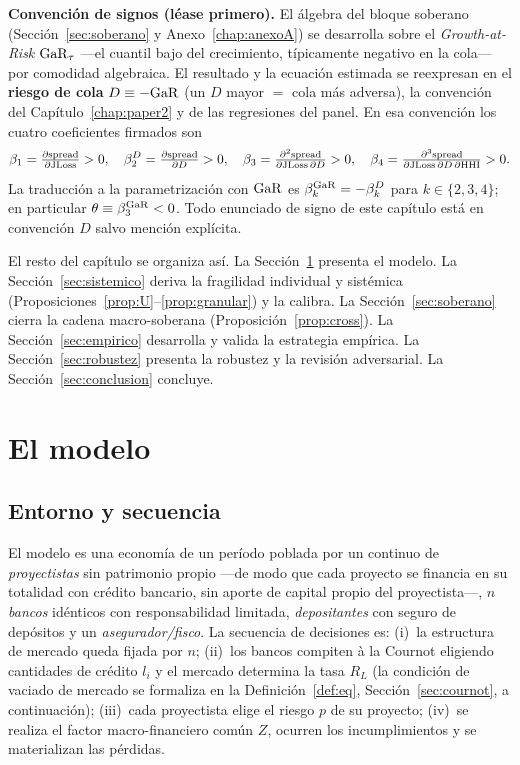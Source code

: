 \begin{mdframed}
\noindent\textbf{Convención de signos (léase primero).} El álgebra del bloque soberano
(Sección~\ref{sec:soberano} y Anexo~\ref{chap:anexoA}) se desarrolla sobre el
\textit{Growth-at-Risk} $\mathrm{GaR}_\tau$ —el cuantil bajo del crecimiento, típicamente
negativo en la cola— por comodidad algebraica. El resultado y la ecuación estimada
se reexpresan en el \textbf{riesgo de cola} $D\equiv-\mathrm{GaR}$ (un $D$ mayor $=$ cola
más adversa), la convención del Capítulo~\ref{chap:paper2} y de las regresiones del
panel. En esa convención los cuatro coeficientes firmados son
\[
\beta_1=\tfrac{\partial\mathrm{spread}}{\partial\mathrm{JLoss}}>0,\quad
\beta_2^{D}=\tfrac{\partial\mathrm{spread}}{\partial D}>0,\quad
\beta_3=\tfrac{\partial^2\mathrm{spread}}{\partial\mathrm{JLoss}\,\partial D}>0,\quad
\beta_4=\tfrac{\partial^3\mathrm{spread}}{\partial\mathrm{JLoss}\,\partial D\,\partial\mathrm{HHI}}>0.
\]
La traducción a la parametrización con $\mathrm{GaR}$ es $\beta_k^{\mathrm{GaR}}=-\beta_k^{D}$ para
$k\in\{2,3,4\}$; en particular $\theta\equiv\beta_3^{\mathrm{GaR}}<0$. Todo enunciado de
signo de este capítulo está en convención $D$ salvo mención explícita.
\end{mdframed}

El resto del capítulo se organiza así. La Sección~\ref{sec:modelo} presenta el modelo. La Sección~\ref{sec:sistemico} deriva la fragilidad individual y sistémica (Proposiciones~\ref{prop:U}--\ref{prop:granular}) y la calibra. La Sección~\ref{sec:soberano} cierra la cadena macro-soberana (Proposición~\ref{prop:cross}). La Sección~\ref{sec:empirico} desarrolla y valida la estrategia empírica. La Sección~\ref{sec:robustez} presenta la robustez y la revisión adversarial. La Sección~\ref{sec:conclusion} concluye.

\section{El modelo}\label{sec:modelo}

\subsection{Entorno y secuencia}
El modelo es una economía de un período poblada por un continuo de \textit{proyectistas} sin
patrimonio propio —de modo que cada proyecto se financia en su totalidad con crédito bancario,
sin aporte de capital propio del proyectista—, $n$ \textit{bancos} idénticos con
responsabilidad limitada, \textit{depositantes} con seguro de depósitos y un
\textit{asegurador/fisco}. La secuencia de decisiones es:
(i)~la estructura de mercado queda fijada por $n$; (ii)~los bancos compiten à la Cournot
eligiendo cantidades de crédito $l_i$ y el mercado determina la tasa $R_L$ (la condición de
vaciado de mercado se formaliza en la Definición~\ref{def:eq}, Sección~\ref{sec:cournot}, a
continuación); (iii)~cada proyectista elige el riesgo $p$ de su proyecto; (iv)~se realiza el
factor macro-financiero común $Z$, ocurren los incumplimientos y se materializan las pérdidas.

